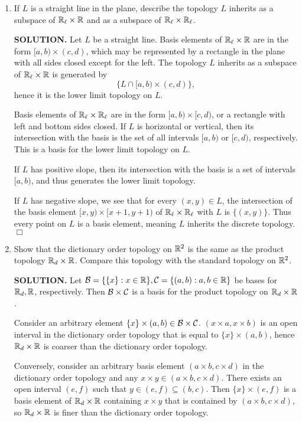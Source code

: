 \documentclass{article}
\begin{document}
\begin{enumerate}
        \item If $L$ is a straight line in the plane, describe the topology $L$ inherits as a subspace of $\mathbb{R}_\ell \times \mathbb{R}$ and as a subspace of $\mathbb{R}_\ell \times \mathbb{R}_\ell$. 

        {\bf SOLUTION.} Let $L$ be a straight line. Basis elements of $\mathbb{R}_\ell \times \mathbb{R}$ are in the form $[a, b) \times (c, d)$, which may be represented by a rectangle in the plane with all sides closed except for the left. The topology $L$ inherits as a subspace of $\mathbb{R}_\ell \times \mathbb{R}$ is generated by
        $$\{ L \cap [a, b) \times (c, d)\},$$
        hence it is the lower limit topology on $L$.

        Basis elements of $\mathbb{R}_\ell \times \mathbb{R}_\ell$ are in the form $[a, b) \times [c, d)$, or a rectangle with left and bottom sides closed. If $L$ is horizontal or vertical, then its intersection with the basis is the set of all intervals $[a, b)$ or $[c, d)$, respectively. This is a basis for the lower limit topology on $L$.

        If $L$ has positive slope, then its intersection with the basis is a set of intervals $[a, b)$, and thus generates the lower limit topology.

        If $L$ has negative slope, we see that for every $(x, y) \in L$, the intersection of the basis element $[x, y) \times [x+1, y+1)$ of $\mathbb{R}_\ell \times \mathbb{R}_\ell$ with $L$ is $\{(x, y)\}$. Thus every point on $L$ is a basis element, meaning $L$ inherits the discrete topology. $\Box$ 

        \item Show that the dictionary order topology on $\mathbb{R}^2$ is the same as the product topology $\mathbb{R}_d \times \mathbb{R}$. Compare this topology with the standard topology on $\mathbb{R}^2$. 

        {\bf SOLUTION.} Let $\mathcal{B} = \{\{x\}: x \in \mathbb{R}\}, \mathcal{C} = \{(a, b): a, b \in \mathbb{R}\}$ be bases for $\mathbb{R}_d, \mathbb{R}$, respectively. Then $\mathcal{B} \times \mathcal{C}$ is a basis for the product topology on $\mathbb{R}_d \times \mathbb{R}$. 
        
        Consider an arbitrary element $\{x\} \times (a, b) \in \mathcal{B} \times \mathcal{C}$. $(x \times a, x \times b)$ is an open interval in the dictionary order topology that is equal to $\{x\} \times (a, b)$, hence $\mathbb{R}_d \times \mathbb{R}$ is coarser than the dictionary order topology.
        
        Conversely, consider an arbitrary basis element $(a \times b, c \times d)$ in the dictionary order topology and any $x \times y \in (a \times b, c \times d)$. There exists an open interval $(e, f)$ such that $y \in (e, f) \subseteq (b, c)$. Then $\{x\} \times (e, f)$ is a basis element of $\mathbb{R}_d \times \mathbb{R}$ containing $x \times y$ that is contained by $(a \times b, c \times d)$, so $\mathbb{R}_d \times \mathbb{R}$ is finer than the dictionary order topology.


\end{enumerate}
\end{document}

